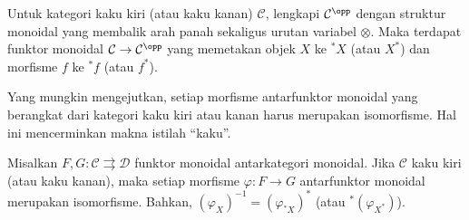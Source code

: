 \begin{corollary}
	Untuk kategori kaku kiri (atau kaku kanan) $\mathcal{C}$, lengkapi $\mathcal{C}^{\opp}$ dengan struktur monoidal yang membalik arah panah sekaligus urutan variabel $\otimes$. Maka terdapat funktor monoidal $\mathcal{C} \to \mathcal{C}^{\opp}$ yang memetakan objek $X$ ke ${}^* X$ (atau $X^*$) dan morfisme $f$ ke ${}^* f$ (atau $f^*$).
\end{corollary}

Yang mungkin mengejutkan, setiap morfisme antarfunktor monoidal yang berangkat dari kategori kaku kiri atau kanan harus merupakan isomorfisme. Hal ini mencerminkan makna istilah ``kaku''.

\begin{proposition}\label{prop:monoidal-functor-rigidity}
	Misalkan $F, G: \mathcal{C} \rightrightarrows \mathcal{D}$ funktor monoidal antarkategori monoidal. Jika $\mathcal{C}$ kaku kiri (atau kaku kanan), maka setiap morfisme $\varphi: F \to G$ antarfunktor monoidal merupakan isomorfisme. Bahkan, $(\varphi_X)^{-1} = \left(\varphi_{{}^* X}\right)^*$ (atau ${}^* \left( \varphi_{X^*} \right)$).
\end{proposition}
